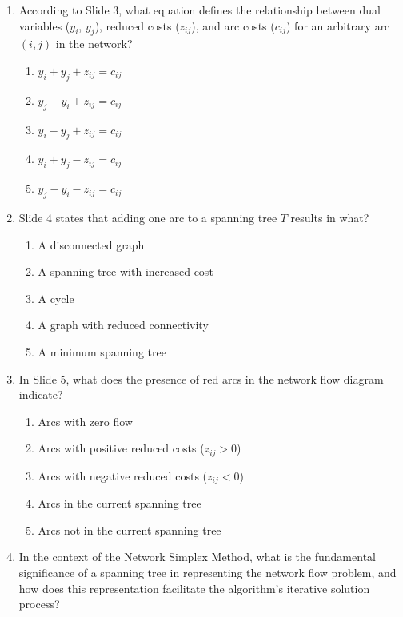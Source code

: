 \documentclass{article}%
\begin{document}
\begin{enumerate}
\begin{enumerate}
\end{enumerate}%
\vspace{1em}%
\item According to Slide 3, what equation defines the relationship between dual variables ($y_i$, $y_j$), reduced costs ($z_{ij}$), and arc costs ($c_{ij}$) for an arbitrary arc $(i, j)$ in the network?%
\begin{enumerate}%
\item $y_i + y_j + z_{ij} = c_{ij}$%
\item $y_j - y_i + z_{ij} = c_{ij}$%
\item $y_i - y_j + z_{ij} = c_{ij}$%
\item $y_i + y_j - z_{ij} = c_{ij}$%
\item $y_j - y_i - z_{ij} = c_{ij}$%
\end{enumerate}%
\vspace{1em}%
\item Slide 4 states that adding one arc to a spanning tree $T$ results in what?%
\begin{enumerate}%
\item A disconnected graph%
\item A spanning tree with increased cost%
\item A cycle%
\item A graph with reduced connectivity%
\item A minimum spanning tree%
\end{enumerate}%
\vspace{1em}%
\item In Slide 5, what does the presence of red arcs in the network flow diagram indicate?%
\begin{enumerate}%
\item Arcs with zero flow%
\item Arcs with positive reduced costs ($z_{ij} > 0$)%
\item Arcs with negative reduced costs ($z_{ij} < 0$)%
\item Arcs in the current spanning tree%
\item Arcs not in the current spanning tree%
\end{enumerate}%
\vspace{1em}%
\item In the context of the Network Simplex Method, what is the fundamental significance of a spanning tree in representing the network flow problem, and how does this representation facilitate the algorithm's iterative solution process?%
\begin{enumerate}%

\end{enumerate}
\end{enumerate}
\end{document}
